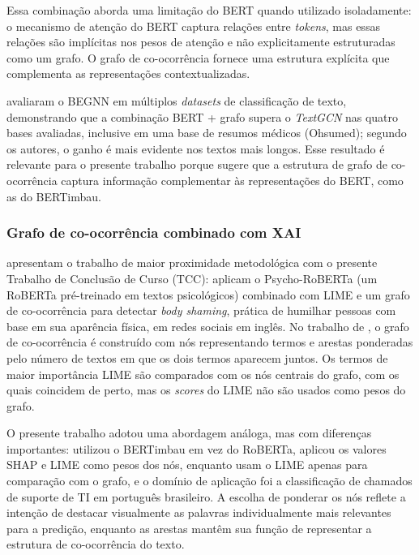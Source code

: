 \documentclass[
    12pt,                %
    openright,           %
    oneside,             %
    a4paper,             %
    english,             %
    brazil               %
]{abntex2}
\begin{document}
Essa combinação aborda uma limitação do BERT quando utilizado isoladamente: o mecanismo de atenção do BERT captura relações entre \textit{tokens}, mas essas relações são implícitas nos pesos de atenção e não explicitamente estruturadas como um grafo. O grafo de co-ocorrência fornece uma estrutura explícita que complementa as representações contextualizadas.

\label{subsubsec:bert_grafo_resultados}

 avaliaram o BEGNN em múltiplos \textit{datasets} de classificação de texto, demonstrando que a combinação BERT + grafo supera o \textit{TextGCN} nas quatro bases avaliadas, inclusive em uma base de resumos médicos (Ohsumed); segundo os autores, o ganho é mais evidente nos textos mais longos. Esse resultado é relevante para o presente trabalho porque sugere que a estrutura de grafo de co-ocorrência captura informação complementar às representações do BERT, como as do BERTimbau.

\subsubsection{Grafo de co-ocorrência combinado com XAI}
\label{subsec:grafo_xai}

\label{subsubsec:grafo_xai_ponderacao}

 apresentam o trabalho de maior proximidade 
metodológica com o presente Trabalho de Conclusão de Curso (TCC): aplicam o Psycho-RoBERTa (um RoBERTa pré-treinado em textos psicológicos) combinado com LIME 
e um grafo de co-ocorrência para detectar \textit{body shaming}, 
prática de humilhar pessoas com base em sua aparência física, em 
redes sociais em inglês. No trabalho de , o grafo de co-ocorrência é construído com nós representando termos e arestas ponderadas pelo número de textos em que os dois termos aparecem juntos. Os termos de maior importância LIME são comparados com os nós centrais do grafo, com os quais coincidem de perto, mas os \textit{scores} do LIME não são usados como pesos do grafo.

O presente trabalho adotou uma abordagem análoga, mas com diferenças importantes: utilizou o BERTimbau em vez do RoBERTa, aplicou os valores SHAP e LIME como pesos dos nós, enquanto  usam o LIME apenas para comparação com o grafo, e o domínio de aplicação foi a classificação de chamados de suporte de TI em português brasileiro. A escolha de ponderar os nós reflete a intenção de destacar visualmente as palavras individualmente mais relevantes para a predição, enquanto as arestas mantêm sua função de representar a estrutura de co-ocorrência do texto.
\end{document}
